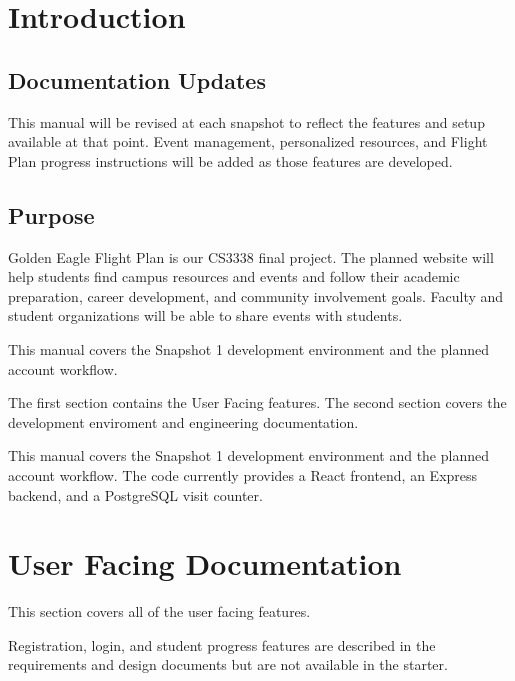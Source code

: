 \newcommand{\documentName}{User Manual}
\newcommand{\shortDocumentName}{UM}





\firstPageBlock

\newpage %
\section{Introduction}

\subsection{Documentation Updates}
This manual will be revised at each snapshot to reflect the features and setup available at that point. Event management, personalized resources, and Flight Plan progress instructions will be added as those features are developed.


\subsection{Purpose}
Golden Eagle Flight Plan is our CS3338 final project. The planned website will help students find campus resources and events and follow their academic preparation, career development, and community involvement goals. Faculty and student organizations will be able to share events with students.

This manual covers the Snapshot 1 development environment and the planned account workflow.

The first section contains the User Facing features.
The second section covers the development enviroment and engineering documentation.

This manual covers the Snapshot 1 development environment and the planned account workflow. The code currently provides a React frontend, an Express backend, and a PostgreSQL visit counter. 

\section{User Facing Documentation}
This section covers all of the user facing features.

Registration, login, and student progress features are described in the requirements and design documents but are not available in the starter.

